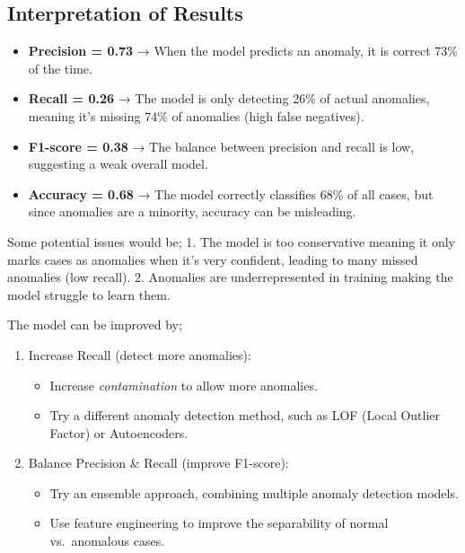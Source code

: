 \documentclass[11pt]{article}
\providecommand{\tightlist}{%
      \setlength{\itemsep}{0pt}\setlength{\parskip}{0pt}}
\begin{document}
    \subsection{Interpretation of Results}\label{interpretation-of-results}

\begin{itemize}
\tightlist
\item
  \textbf{Precision = 0.73} → When the model predicts an anomaly, it is
  correct 73\% of the time.
\item
  \textbf{Recall = 0.26} → The model is only detecting 26\% of actual
  anomalies, meaning it's missing 74\% of anomalies (high false
  negatives).
\item
  \textbf{F1-score = 0.38} → The balance between precision and recall is
  low, suggesting a weak overall model.
\item
  \textbf{Accuracy = 0.68} → The model correctly classifies 68\% of all
  cases, but since anomalies are a minority, accuracy can be misleading.
\end{itemize}

Some potential issues would be; 1. The model is too conservative meaning
it only marks cases as anomalies when it's very confident, leading to
many missed anomalies (low recall). 2. Anomalies are underrepresented in
training making the model struggle to learn them.

The model can be improved by;

\begin{enumerate}
\def\labelenumi{\arabic{enumi}.}
\tightlist
\item
  Increase Recall (detect more anomalies):

  \begin{itemize}
  \tightlist
  \item
    Increase \emph{contamination} to allow more anomalies.
  \item
    Try a different anomaly detection method, such as LOF (Local Outlier
    Factor) or Autoencoders.
  \end{itemize}
\item
  Balance Precision \& Recall (improve F1-score):

  \begin{itemize}
  \tightlist
  \item
    Try an ensemble approach, combining multiple anomaly detection
    models.
  \item
    Use feature engineering to improve the separability of normal
    vs.~anomalous cases.
  \end{itemize}
\end{enumerate}
\end{document}
